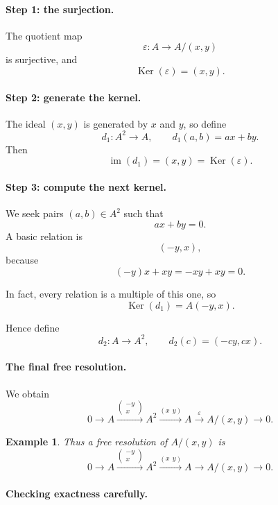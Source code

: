 \documentclass[12pt,a4paper]{article}
\theoremstyle{notespace}
\DeclareMathOperator{\im}{im}
\newtheorem{example}[definition]{Example}
\newcommand{\kerf}{\operatorname{Ker}}
\begin{document}
\paragraph{Step 1: the surjection.}

The quotient map
\[
\varepsilon:A\to A/(x,y)
\]
is surjective, and
\[
\kerf(\varepsilon)=(x,y).
\]

\paragraph{Step 2: generate the kernel.}

The ideal \((x,y)\) is generated by \(x\) and \(y\), so define
\[
d_1:A^2\to A,\qquad d_1(a,b)=ax+by.
\]
Then
\[
\im(d_1)=(x,y)=\kerf(\varepsilon).
\]

\paragraph{Step 3: compute the next kernel.}

We seek pairs \((a,b)\in A^2\) such that
\[
ax+by=0.
\]
A basic relation is
\[
(-y,x),
\]
because
\[
(-y)x + x y = -xy+xy=0.
\]

In fact, every relation is a multiple of this one, so
\[
\kerf(d_1)=A(-y,x).
\]

Hence define
\[
d_2:A\to A^2,\qquad d_2(c)=(-cy,cx).
\]

\paragraph{The final free resolution.}

We obtain
\[
0\longrightarrow A \xrightarrow{\begin{pmatrix}-y\\x\end{pmatrix}} A^2 \xrightarrow{(x\ \ y)} A \xrightarrow{\varepsilon} A/(x,y)\longrightarrow 0.
\]

\begin{example}
	Thus a free resolution of \(A/(x,y)\) is
	\[
	0\longrightarrow A \xrightarrow{\begin{pmatrix}-y\\x\end{pmatrix}} A^2 \xrightarrow{(x\ \ y)} A \longrightarrow A/(x,y)\longrightarrow 0.
	\]
\end{example}

\paragraph{Checking exactness carefully.}
\end{document}
